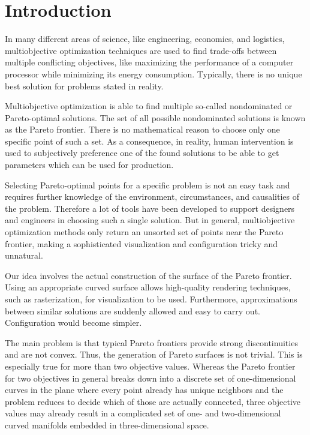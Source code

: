 \documentclass{stdlocal}
\begin{document}
\section{Introduction} %
\label{sec:introduction}
  In many different areas of science, like engineering, economics, and logistics, multiobjective optimization techniques are used to find trade-offs between multiple conflicting objectives, like maximizing the performance of a computer processor while minimizing its energy consumption.
  Typically, there is no unique best solution for problems stated in reality.

  Multiobjective optimization is able to find multiple so-called nondominated or Pareto-optimal solutions.
  The set of all possible nondominated solutions is known as the Pareto frontier.
  There is no mathematical reason to choose only one specific point of such a set.
  As a consequence, in reality, human intervention is used to subjectively preference one of the found solutions to be able to get parameters which can be used for production.

  Selecting Pareto-optimal points for a specific problem is not an easy task and requires further knowledge of the environment, circumstances, and causalities of the problem.
  Therefore a lot of tools have been developed to support designers and engineers in choosing such a single solution.
  But in general, multiobjective optimization methods only return an unsorted set of points near the Pareto frontier, making a sophisticated visualization and configuration tricky and unnatural.

  Our idea involves the actual construction of the surface of the Pareto frontier.
  Using an appropriate curved surface allows high-quality rendering techniques, such as rasterization, for visualization to be used.
  Furthermore, approximations between similar solutions are suddenly allowed and easy to carry out.
  Configuration would become simpler.

  The main problem is that typical Pareto frontiers provide strong discontinuities and are not convex.
  Thus, the generation of Pareto surfaces is not trivial.
  This is especially true for more than two objective values.
  Whereas the Pareto frontier for two objectives in general breaks down into a discrete set of one-dimensional curves in the plane where every point already has unique neighbors and the problem reduces to decide which of those are actually connected, three objective values may already result in a complicated set of one- and two-dimensional curved manifolds embedded in three-dimensional space.
\end{document}
